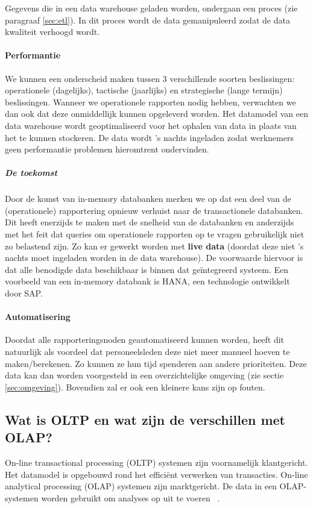 Gegevens die in een data warehouse geladen worden, ondergaan een proces (zie paragraaf \ref{sec:etl}). In dit proces wordt de data gemanipuleerd zodat de data kwaliteit verhoogd wordt.

\paragraph{Performantie}
We kunnen een onderscheid maken tussen 3 verschillende soorten beslissingen: operationele (dagelijks), tactische (jaarlijks) en strategische (lange termijn) beslissingen. Wanneer we operationele rapporten nodig hebben, verwachten we dan ook dat deze onmiddellijk kunnen opgeleverd worden. Het datamodel van een data warehouse wordt geoptimaliseerd voor het ophalen van data in plaats van het te kunnen stockeren. De data wordt 's nachts ingeladen zodat werknemers geen performantie problemen hieromtrent ondervinden. 

\subparagraph{De toekomst}
Door de komst van in-memory databanken merken we op dat een deel van de (operationele) rapportering opnieuw verhuist naar de transactionele databanken. Dit heeft enerzijds te maken met de snelheid van de databanken en anderzijds met het feit dat queries om operationele rapporten op te vragen gebruikelijk niet zo belastend zijn. Zo kan er gewerkt worden met \textbf{live data} (doordat deze niet 's nachts moet ingeladen worden in de data warehouse). De voorwaarde hiervoor is dat alle benodigde data beschikbaar is binnen dat geïntegreerd systeem. Een voorbeeld van een in-memory databank is HANA, een technologie ontwikkelt door SAP.

\paragraph{Automatisering}
Doordat alle rapporteringsnoden geautomatiseerd kunnen worden, heeft dit natuurlijk als voordeel dat personeelsleden deze niet meer manueel hoeven te maken/berekenen. Zo kunnen ze hun tijd spenderen aan andere prioriteiten. Deze data kan dan worden voorgesteld in een overzichtelijke omgeving (zie sectie \ref{sec:omgeving}). Bovendien zal er ook een kleinere kans zijn op fouten.

\subsection{Wat is OLTP en wat zijn de verschillen met OLAP?}
\label{sec:oltp-vs-olap}
On-line transactional processing (OLTP) systemen zijn voornamelijk klantgericht. Het datamodel is opgebouwd rond het efficiënt verwerken van transacties. On-line analytical processing (OLAP) systemen zijn marktgericht. De data in een OLAP-systemen worden gebruikt om analyses op uit te voeren ~\autocite{Satyanarayana2010}.


